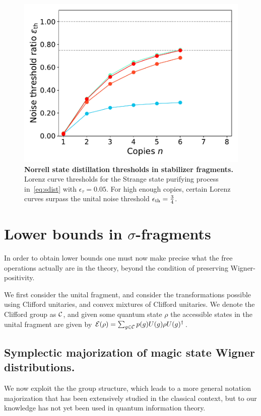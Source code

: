 \documentclass[pra,
aps,
twocolumn,
superscriptaddress,
groupedaddress,
nofootinbib,
reprint
]{revtex4-1}
\begin{document}
\begin{figure}
    \centering
    \includegraphics[scale=0.5]{figs/stab_distill_norrell.pdf}
    \caption{\textbf{Norrell state distillation thresholds in stabilizer fragments.} Lorenz curve thresholds for the Strange state purifying process in~\cref{eq:sdist} with $\epsilon_\tau = 0.05$.
    For high enough copies, certain Lorenz curves surpass the unital noise threshold $\epsilon_{\rm{th}} = \frac{3}{4}$.
    }
    \label{fig:stab_distill_norrell}
\end{figure}


\section{Lower bounds in $\sigma$-fragments}

In order to obtain lower bounds one must now make precise what the free operations actually are in the  theory, beyond the condition of preserving Wigner-positivity.

We first consider the unital fragment, and consider the transformations possible using Clifford unitaries, and convex mixtures of Clifford unitaries. We denote the Clifford group as $\mathcal{C}$, and given some quantum state $\rho$ the accessible states in the unital fragment are given by $\mathcal{E}(\rho) = \sum_{g \in \mathcal{C}} p(g) U(g) \rho U(g)^\dagger$.

\subsection{Symplectic majorization of magic state Wigner distributions.}
We now exploit the the group structure, which leads to a more general notation majorization that has been extensively studied in the classical context, but to our knowledge has not yet been used in quantum information theory.
\end{document}
